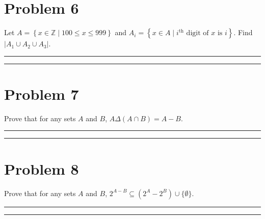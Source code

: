 \documentclass{article}
\theoremstyle{definition}
\newenvironment{solution}{\bigskip\hrule{\hfill}}{\bigskip\hrule{\hfill}} %
\begin{document}

\newpage


\section*{Problem 6}
Let $A=\left\{x\in\mathbb{Z}\mid 100\leq x\leq 999\right\}$ and $A_i=\left\{x\in A\mid i^{\text{th}}\text{ digit of }x\text{ is }i\right\}$. Find $\left|A_1\cup A_2\cup A_3\right|$.
\begin{solution}


\end{solution}


\newpage


\section*{Problem 7}
Prove that for any sets $A$ and $B$, $A\Delta\left(A\cap B\right)=A-B$.
\begin{solution}


\end{solution}


\newpage


\section*{Problem 8}
Prove that for any sets $A$ and $B$, $2^{A-B}\subseteq\left(2^A-2^B\right)\cup\{\emptyset\}$.
\begin{solution}


\end{solution}
\end{document}
